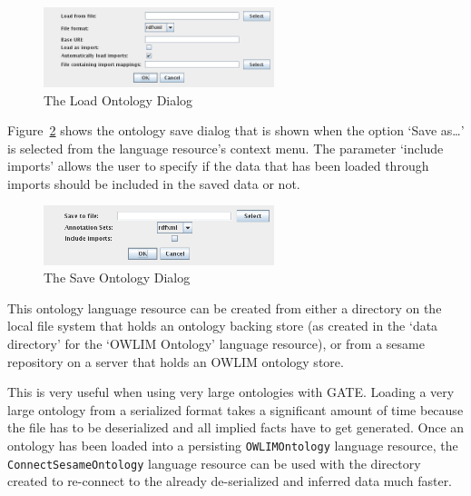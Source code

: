\begin{figure}[!htbp]
\begin{center}
\includegraphics[width=0.6\textwidth]{ontology_lr_load.png}
\caption{The Load Ontology Dialog}
\label{fig:ontology_lr_load}
\end{center}
\end{figure}

Figure~\ref{fig:ontology_lr_save} shows the ontology save 
dialog that is shown when the option `Save as\dots' is selected from
the language resource's context menu. 
The parameter `include imports' allows the user to specify if the data 
that has been loaded through imports should be included in the saved data or not.

\begin{figure}[!htbp]
\begin{center}
\includegraphics[width=0.6\textwidth]{ontology_lr_save.png}
\caption{The Save Ontology Dialog}
\label{fig:ontology_lr_save}
\end{center}
\end{figure}



This ontology language resource can be created from either 
a directory on the local file system that holds an ontology backing store
(as created in the `data directory' for the `OWLIM Ontology' language resource),
or from a sesame repository on a server that holds an OWLIM ontology 
store.

This is very useful when using very large ontologies with GATE. Loading a 
very large ontology from a serialized format takes a significant amount
of time because the file has to be deserialized and all implied facts
have to get generated. Once an ontology has been loaded into a persisting
\texttt{OWLIMOntology} language resource, the \texttt{ConnectSesameOntology} language resource can
be used with the directory created to re-connect to the already de-serialized
and inferred data much faster.

